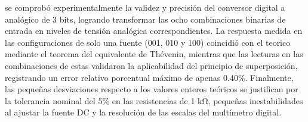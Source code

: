 se comprobó experimentalmente la validez y precisión del conversor digital a analógico de 3 bits, logrando transformar las ocho combinaciones binarias de entrada en niveles de tensión analógica correspondientes. La respuesta medida en las configuraciones de solo una fuente (001, 010 y 100) coincidió con el teorico mediante el teorema del equivalente de Thévenin, mientras que las lecturas en las combinaciones de estas validaron la aplicabilidad del principio de superposición, registrando un error relativo porcentual máximo de apenas 0.40\%. Finalmente, las pequeñas desviaciones respecto a los valores enteros teóricos se justifican por la tolerancia nominal del 5\% en las resistencias de 1 \unit{\kilo\ohm}, pequeñas inestabilidades al ajustar la fuente DC y la resolución de las escalas del multímetro digital.
